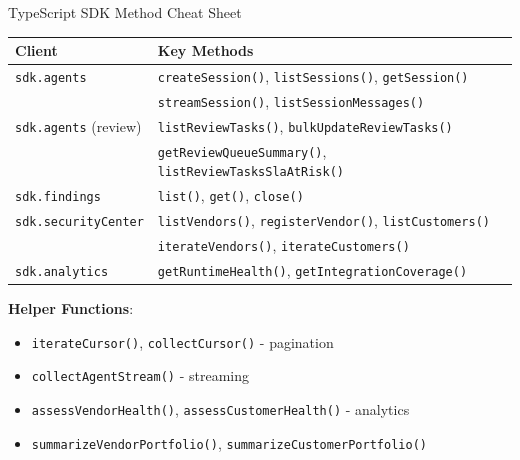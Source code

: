 \documentclass[aspectratio=169]{beamer}
\begin{document}
\begin{frame}{TypeScript SDK Method Cheat Sheet}
\scriptsize
\begin{tabular}{ll}
\toprule
\textbf{Client} & \textbf{Key Methods} \\
\midrule
\texttt{sdk.agents} & \texttt{createSession()}, \texttt{listSessions()}, \texttt{getSession()} \\
 & \texttt{streamSession()}, \texttt{listSessionMessages()} \\
\midrule
\texttt{sdk.agents} (review) & \texttt{listReviewTasks()}, \texttt{bulkUpdateReviewTasks()} \\
 & \texttt{getReviewQueueSummary()}, \texttt{listReviewTasksSlaAtRisk()} \\
\midrule
\texttt{sdk.findings} & \texttt{list()}, \texttt{get()}, \texttt{close()} \\
\midrule
\texttt{sdk.securityCenter} & \texttt{listVendors()}, \texttt{registerVendor()}, \texttt{listCustomers()} \\
 & \texttt{iterateVendors()}, \texttt{iterateCustomers()} \\
\midrule
\texttt{sdk.analytics} & \texttt{getRuntimeHealth()}, \texttt{getIntegrationCoverage()} \\
\bottomrule
\end{tabular}

\vspace{0.3cm}

\textbf{Helper Functions}:
\begin{itemize}
  \item \texttt{iterateCursor()}, \texttt{collectCursor()} - pagination
  \item \texttt{collectAgentStream()} - streaming
  \item \texttt{assessVendorHealth()}, \texttt{assessCustomerHealth()} - analytics
  \item \texttt{summarizeVendorPortfolio()}, \texttt{summarizeCustomerPortfolio()}
\end{itemize}
\end{frame}
\end{document}
